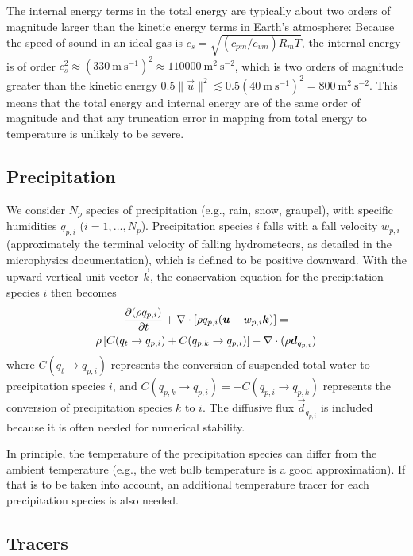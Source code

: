 \documentclass{article}
\begin{document}
The internal energy terms in the total energy are typically about two orders of magnitude larger than the kinetic energy terms in Earth's atmosphere: Because the speed of sound in an ideal gas is $c_s = \sqrt{(c_{pm}/c_{vm}) R_m T}$, the internal energy is of order $c_s^2 \approx (330~\mathrm{m~s^{-1}})^2 \approx 110000~\mathrm{m^2~s^{-2}}$, which is two orders of magnitude greater than the kinetic energy $0.5 \|\vec{u}\|^2 \lesssim 0.5(40~\mathrm{m~s^{-1}})^2 = 800~\mathrm{m^2~s^{-2}}$. This means that the total energy and internal energy are of the same order of magnitude and that any truncation error in mapping from total energy to temperature is unlikely to be severe.

\subsection{Precipitation}

We  consider $N_p$ species of precipitation (e.g., rain, snow, graupel), with specific humidities $q_{p,i}$ ($i=1,\dots,N_p$). Precipitation species $i$ falls with a fall velocity $w_{p,i}$ (approximately the terminal velocity of falling hydrometeors, as detailed in the microphysics documentation), which is defined to be positive downward. With the upward vertical unit vector $\vec{k}$, the conservation equation for the precipitation species $i$ then becomes
\begin{multline}
\frac{\partial (\rho q_{p,i})}{\partial t} + \nabla \cdot \left[\rho q_{p,i} (\boldsymbol{{u}} - w_{p,i} \boldsymbol{{k}}) \right] =\\
\rho \left[C(q_t \rightarrow q_{p,i}) + C(q_{p,k} \rightarrow q_{p,i}) \right] -\nabla \cdot (\rho \boldsymbol{{d}}_{q_{p, i}})
\label{eq:precip}
\end{multline}
where $C(q_t \rightarrow q_{p,i})$ represents the conversion of suspended total water to precipitation species $i$, and $C(q_{p,k} \rightarrow q_{p,i}) = -C(q_{p,i} \rightarrow q_{p,k})$ represents the conversion of precipitation species $k$ to $i$. The diffusive flux $\vec{d}_{q_{p, i}}$ is included because it is often needed for numerical stability.

In principle, the temperature of the precipitation species can differ from the ambient temperature (e.g., the wet bulb temperature is a good approximation). If that is to be taken into account, an additional temperature tracer for each precipitation species is also needed.

\subsection{Tracers}
\end{document}
